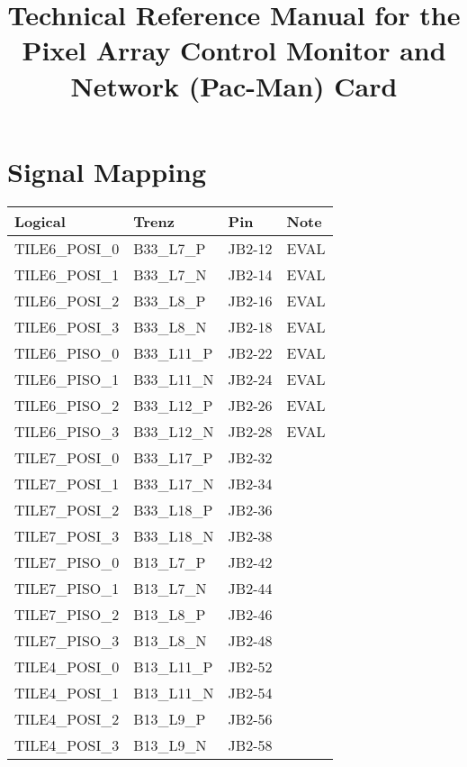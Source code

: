 \documentclass[12pt]{article}
\begin{document}

\title{Technical Reference Manual for the Pixel Array Control Monitor and Network (Pac-Man) Card}

\maketitle

\section{Signal Mapping}

\newpage
\begin{tabular}{llll}
\hline
Logical & Trenz & Pin & Note\\  
\hline
TILE6\_POSI\_0     & B33\_L7\_P   & JB2-12 & EVAL\\
TILE6\_POSI\_1     & B33\_L7\_N   & JB2-14 & EVAL\\
TILE6\_POSI\_2     & B33\_L8\_P   & JB2-16 & EVAL\\
TILE6\_POSI\_3     & B33\_L8\_N   & JB2-18 & EVAL\\
\hline
TILE6\_PISO\_0     & B33\_L11\_P  & JB2-22 & EVAL\\
TILE6\_PISO\_1     & B33\_L11\_N  & JB2-24 & EVAL\\
TILE6\_PISO\_2     & B33\_L12\_P  & JB2-26 & EVAL\\
TILE6\_PISO\_3     & B33\_L12\_N  & JB2-28 & EVAL\\
\hline
TILE7\_POSI\_0     & B33\_L17\_P  & JB2-32 & \\
TILE7\_POSI\_1     & B33\_L17\_N  & JB2-34 & \\
TILE7\_POSI\_2     & B33\_L18\_P  & JB2-36 & \\
TILE7\_POSI\_3     & B33\_L18\_N  & JB2-38 & \\
\hline
TILE7\_PISO\_0     & B13\_L7\_P   & JB2-42& \\
TILE7\_PISO\_1     & B13\_L7\_N   & JB2-44& \\
TILE7\_PISO\_2     & B13\_L8\_P   & JB2-46& \\
TILE7\_PISO\_3     & B13\_L8\_N   & JB2-48& \\
\hline
TILE4\_POSI\_0     & B13\_L11\_P  & JB2-52 & \\
TILE4\_POSI\_1     & B13\_L11\_N  & JB2-54 & \\
TILE4\_POSI\_2     & B13\_L9\_P   & JB2-56 & \\
TILE4\_POSI\_3     & B13\_L9\_N   & JB2-58 & \\

\end{tabular}
\end{document}
